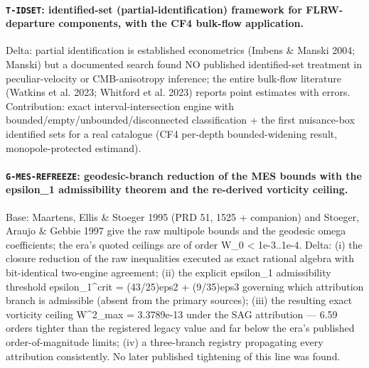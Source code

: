 \documentclass[10pt]{article}
\theoremstyle{definition}
\newcommand{\code}[1]{\texttt{\small #1}}
\begin{document}
\paragraph{\code{T-IDSET}: identified-set (partial-identification) framework for FLRW-departure components, with the CF4 bulk-flow application.}
Delta: partial identification is established econometrics (Imbens \& Manski 2004; Manski) but a documented search found NO published identified-set treatment in peculiar-velocity or CMB-anisotropy inference; the entire bulk-flow literature (Watkins et al. 2023; Whitford et al. 2023) reports point estimates with errors. Contribution: exact interval-intersection engine with bounded/empty/unbounded/disconnected classification + the first nuisance-box identified sets for a real catalogue (CF4 per-depth bounded-widening result, monopole-protected estimand).

\paragraph{\code{G-MES-REFREEZE}: geodesic-branch reduction of the MES bounds with the epsilon\_1 admissibility theorem and the re-derived vorticity ceiling.}
Base: Maartens, Ellis \& Stoeger 1995 (PRD 51, 1525 + companion) and Stoeger, Araujo \& Gebbie 1997 give the raw multipole bounds and the geodesic omega coefficients; the era's quoted ceilings are of order W\_0 < 1e-3..1e-4. Delta: (i) the closure reduction of the raw inequalities executed as exact rational algebra with bit-identical two-engine agreement; (ii) the explicit epsilon\_1 admissibility threshold epsilon\_1\^{}crit = (43/25)eps2 + (9/35)eps3 governing which attribution branch is admissible (absent from the primary sources); (iii) the resulting exact vorticity ceiling W\^{}2\_max = 3.3789e-13 under the SAG attribution — 6.59 orders tighter than the registered legacy value and far below the era's published order-of-magnitude limits; (iv) a three-branch registry propagating every attribution consistently. No later published tightening of this line was found.
\end{document}

